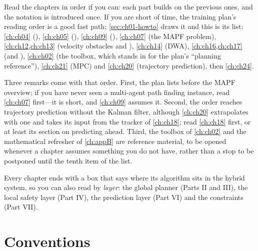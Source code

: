 Read the chapters in order if you can: each part builds on the previous ones, and the
notation is introduced once. If you are short of time, the training plan's reading
order is a good fast path; \cref{sec:ch01-howto} draws it and this is its list:
\cref{ch:ch04} (\astar), \cref{ch:ch05} (\dstarlite), \cref{ch:ch09} (\cbs),
\cref{ch:ch07} (the MAPF problem), \cref{ch:ch12,ch:ch13} (velocity obstacles and
\orca), \cref{ch:ch14} (DWA), \cref{ch:ch16,ch:ch17} (\rrt and \rrtstar),
\cref{ch:ch02} (the toolbox, which stands in for the plan's ``planning reference''),
\cref{ch:ch21} (MPC) and \cref{ch:ch20} (trajectory prediction), then \cref{ch:ch24}.

Three remarks come with that order. First, the plan lists \cbs before the MAPF
overview; if you have never seen a multi-agent path finding instance, read
\cref{ch:ch07} first---it is short, and \cref{ch:ch09} assumes it. Second, the order
reaches trajectory prediction without the Kalman filter, although \cref{ch:ch20}
extrapolates with one and takes its input from the tracker of \cref{ch:ch18}; read
\cref{ch:ch18} first, or at least its section on predicting ahead. Third, the toolbox
of \cref{ch:ch02} and the mathematical refresher of \cref{ch:appB} are reference
material, to be opened whenever a chapter assumes something you do not have, rather
than a stop to be postponed until the tenth item of the list.

Every chapter ends with a box that says where its algorithm sits in the hybrid system,
so you can also read by \emph{layer}: the global planner (Parts II and III), the local
safety layer (Part IV), the prediction layer (Part VI) and the constraints (Part VII).

\section*{Conventions}

